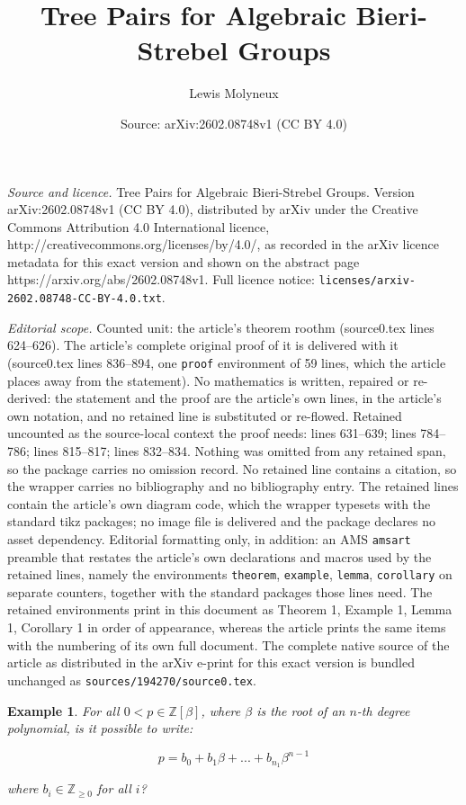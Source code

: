 \documentclass[10pt,a4paper]{amsart}
\title{Tree Pairs for Algebraic Bieri-Strebel Groups}
\author{Lewis Molyneux}
\date{Source: arXiv:2602.08748v1 (CC BY 4.0)}
\newtheorem{example}{Example}
\begin{document}
\maketitle

\noindent\emph{Source and licence.} Tree Pairs for Algebraic Bieri-Strebel Groups. Version arXiv:2602.08748v1 (CC BY 4.0), distributed by arXiv under the Creative Commons Attribution 4.0 International licence, http://creativecommons.org/licenses/by/4.0/, as recorded in the arXiv licence metadata for this exact version and shown on the abstract page https://arxiv.org/abs/2602.08748v1. Full licence notice: \texttt{licenses/arxiv-2602.08748-CC-BY-4.0.txt}.\par\smallskip

\noindent\textit{Editorial scope.} Counted unit: the article's theorem roothm (source0.tex lines 624--626). The article's complete original proof of it is delivered with it (source0.tex lines 836--894, one \texttt{proof} environment of 59 lines, which the article places away from the statement). No mathematics is written, repaired or re-derived: the statement and the proof are the article's own lines, in the article's own notation, and no retained line is substituted or re-flowed.  Retained uncounted as the source-local context the proof needs: lines 631--639; lines 784--786; lines 815--817; lines 832--834.  Nothing was omitted from any retained span, so the package carries no omission record.  No retained line contains a citation, so the wrapper carries no bibliography and no bibliography entry.  The retained lines contain the article's own diagram code, which the wrapper typesets with the standard tikz packages; no image file is delivered and the package declares no asset dependency.  Editorial formatting only, in addition: an AMS \texttt{amsart} preamble that restates the article's own declarations and macros used by the retained lines, namely the environments \texttt{theorem}, \texttt{example}, \texttt{lemma}, \texttt{corollary} on separate counters, together with the standard packages those lines need.  The retained environments print in this document as Theorem 1, Example 1, Lemma 1, Corollary 1 in order of appearance, whereas the article prints the same items with the numbering of its own full document.  The complete native source of the article as distributed in the arXiv e-print for this exact version is bundled unchanged as \texttt{sources/194270/source0.tex}.
\begin{example} \label{rootfind}
For all $0<p \in \mathbb{Z}[\beta]$, where $\beta$ is the root of an $n$-th degree polynomial, is it possible to write:

$$
p = b_0 + b_1 \beta +...+b_{n_1} \beta^{n-1}
$$

where $b_i \in \mathbb{Z}_{\geq 0}$ for all $i$?
\end{example}
\end{document}

